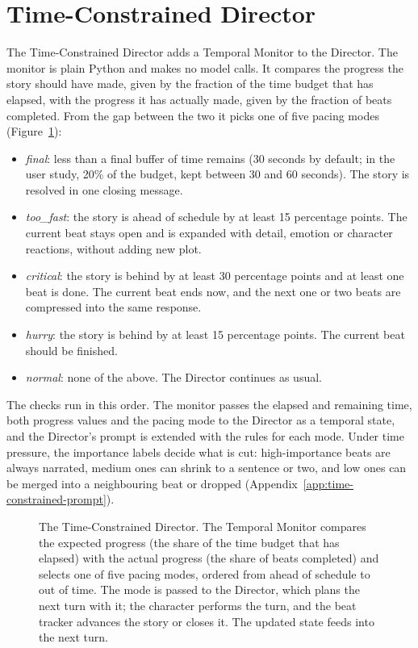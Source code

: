 \section{Time-Constrained Director}\label{sec:tcdirector}

The Time-Constrained Director adds a Temporal Monitor to the Director. The monitor is plain Python and makes no model calls. It compares the progress the story should have made, given by the fraction of the time budget that has elapsed, with the progress it has actually made, given by the fraction of beats completed. From the gap between the two it picks one of five pacing modes (Figure~\ref{fig:tc-pipeline}):

\begin{itemize}
  \item \textit{final}: less than a final buffer of time remains (30 seconds by default; in the user study, 20\% of the budget, kept between 30 and 60 seconds). The story is resolved in one closing message.
  \item \textit{too\_fast}: the story is ahead of schedule by at least 15 percentage points. The current beat stays open and is expanded with detail, emotion or character reactions, without adding new plot.
  \item \textit{critical}: the story is behind by at least 30 percentage points and at least one beat is done. The current beat ends now, and the next one or two beats are compressed into the same response.
  \item \textit{hurry}: the story is behind by at least 15 percentage points. The current beat should be finished.
  \item \textit{normal}: none of the above. The Director continues as usual.
\end{itemize}

The checks run in this order. The monitor passes the elapsed and remaining time, both progress values and the pacing mode to the Director as a temporal state, and the Director's prompt is extended with the rules for each mode. Under time pressure, the importance labels decide what is cut: high-importance beats are always narrated, medium ones can shrink to a sentence or two, and low ones can be merged into a neighbouring beat or dropped (Appendix~\ref{app:time-constrained-prompt}).

\begin{figure}[htbp]
\centering
\resizebox{\linewidth}{!}{}
\caption{The Time-Constrained Director. The Temporal Monitor compares the expected progress (the share of the time budget that has elapsed) with the actual progress (the share of beats completed) and selects one of five pacing modes, ordered from ahead of schedule to out of time. The mode is passed to the Director, which plans the next turn with it; the character performs the turn, and the beat tracker advances the story or closes it. The updated state feeds into the next turn.}
\label{fig:tc-pipeline}
\end{figure}

